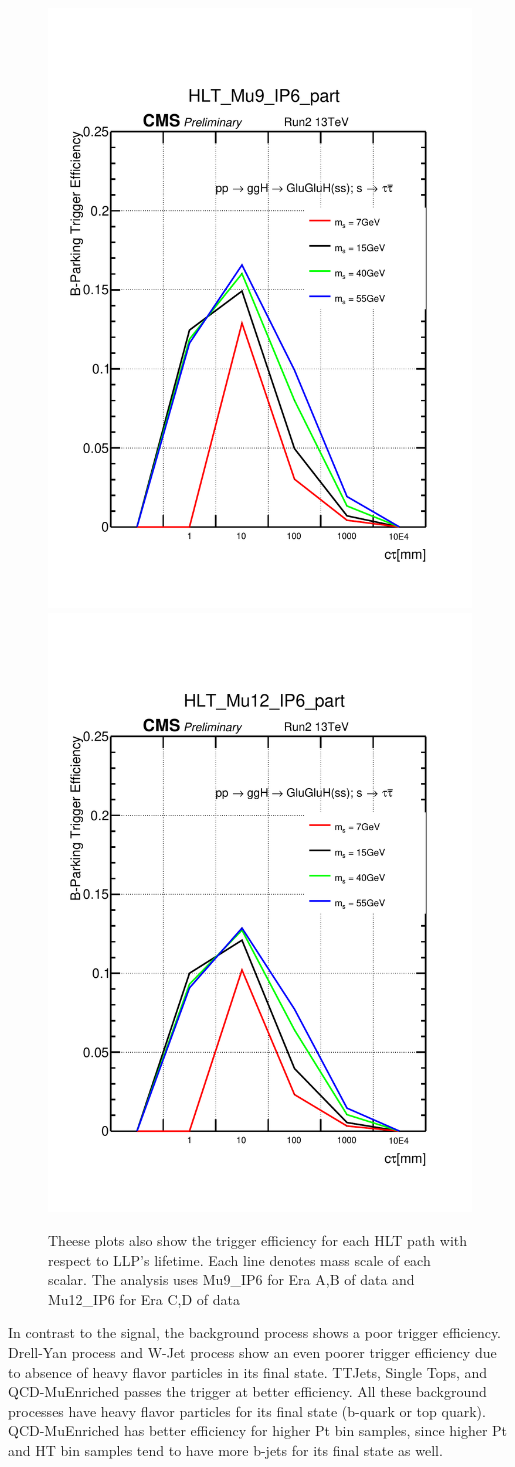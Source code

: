 \begin{figure}[h!]
\caption{Theese plots also show the trigger efficiency for each HLT path with respect to LLP's lifetime. Each line denotes mass scale of each scalar. The analysis uses Mu9\_IP6 for Era A,B of data and Mu12\_IP6 for Era C,D of data}
  \centering
  \includegraphics[width=0.47\linewidth]{figs/TrigEff_HLT_Mu9_IP6_part.pdf}
  \includegraphics[width=0.47\linewidth]{figs/TrigEff_HLT_Mu12_IP6_part.pdf}

\end{figure}

In contrast to the signal, the background process shows a poor trigger efficiency.
Drell-Yan process and W-Jet process show an even poorer trigger efficiency due to absence of heavy flavor particles in its final state.
TTJets, Single Tops, and QCD-MuEnriched passes the trigger at better efficiency.
All these background processes have heavy flavor particles for its final state (b-quark or top quark).
QCD-MuEnriched has better efficiency for higher Pt bin samples, since higher Pt and HT bin samples tend to have more b-jets for its final state as well.


